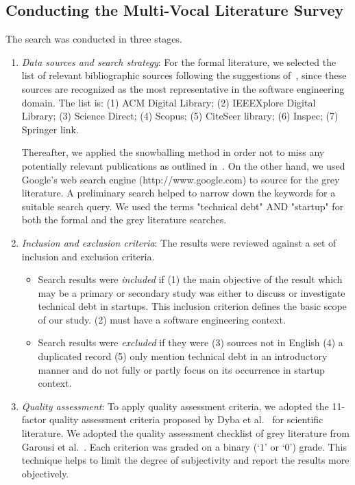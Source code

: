 \subsection{Conducting the Multi-Vocal Literature Survey}
The search was conducted in three stages.
\begin{enumerate}
\item \emph{Data sources and search strategy}: For the formal literature, we selected the list of relevant bibliographic sources following the suggestions of~\cite{kitchenham2007guidelines}, since these sources are
recognized as the most representative in the software engineering domain.
The list is: (1) ACM Digital Library;  (2) IEEEXplore Digital Library; (3) Science Direct; (4) Scopus; (5) CiteSeer library; (6) Inspec; (7) Springer link.

Thereafter, we applied the snowballing method in order not to miss any potentially relevant publications as outlined in~\cite{Wohlin2014/2601248.2601268}.
On the other hand, we used Google's web search engine (http://www.google.com) to source for the grey literature.
A preliminary search helped to narrow down the keywords for a suitable search query.
We used the terms "technical debt" AND "startup" for both the formal and the grey literature searches.

\item \emph{Inclusion and exclusion criteria}: The results were reviewed against a set of inclusion and exclusion criteria.

\begin{itemize}
\item Search results were \emph{included} if 
(1) the main objective of the result which may be a primary or secondary  study was either to discuss or investigate technical debt in startups.
This inclusion criterion defines the basic scope of our study.
(2) must have a software engineering context.

\item Search results were \emph{excluded} if they were 
(3) sources not in English
(4) a duplicated record 
(5) only mention technical debt in an introductory manner and do not fully or partly focus on its occurrence in startup context.
\end{itemize}

\item \emph{Quality assessment}: To apply quality assessment criteria, we adopted the 11-factor quality
assessment criteria proposed by Dyba et al.~\cite{DYBA2008833} for scientific literature.
We adopted the quality assessment checklist of grey literature from Garousi et al.~\cite{GAROUSI2019101}.
Each criterion was graded on a binary (`$1$' or `$0$') grade.
This technique helps to limit the degree of subjectivity and report the results more objectively. 
\end{enumerate}

